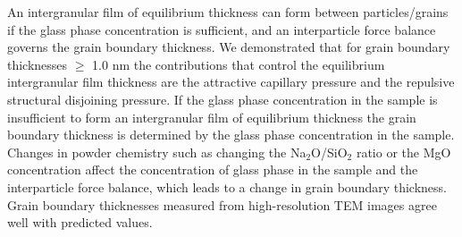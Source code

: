 An intergranular film of equilibrium thickness can form between particles/grains if the glass phase concentration is sufficient, and an interparticle force balance governs the grain boundary thickness. We demonstrated that for grain boundary thicknesses $\geq$ 1.0 nm the contributions that control the equilibrium intergranular film thickness are the attractive capillary pressure and the repulsive structural disjoining pressure. If the glass phase concentration in the sample is insufficient to form an intergranular film of equilibrium thickness the grain boundary thickness is determined by the glass phase concentration in the sample. Changes in powder chemistry such as changing the Na$_{2}$O/SiO$_{2}$ ratio or the MgO concentration affect the concentration of glass phase in the sample and the interparticle force balance, which leads to a change in grain boundary thickness. Grain boundary thicknesses measured from high-resolution TEM images agree well with predicted values.

